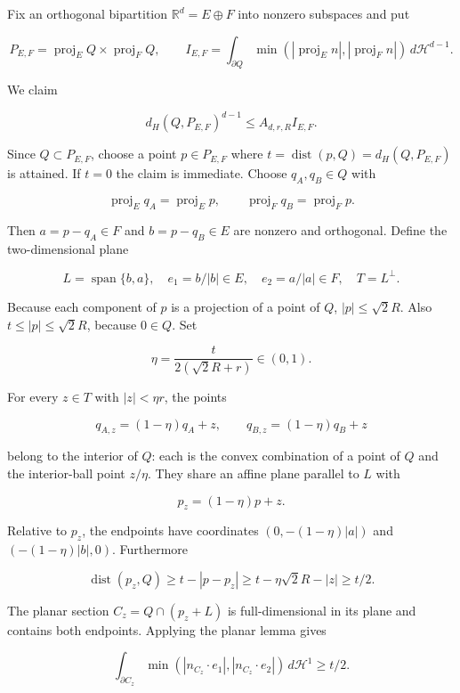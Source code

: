 \documentclass[
  11pt,
]{article}
\begin{document}
Fix an orthogonal bipartition \(\mathbb R^d=E\oplus F\) into nonzero
subspaces and put

\[
 P_{E,F}=\operatorname{proj}_E Q\times\operatorname{proj}_F Q,
\qquad
 I_{E,F}=\int_{\partial Q}
        \min(|\operatorname{proj}_E n|,|\operatorname{proj}_F n|)
        \,d\mathcal H^{d-1}.
\]

We claim

\[
 d_H(Q,P_{E,F})^{d-1}\le A_{d,r,R}I_{E,F}.            \tag{3.1}
\]

Since \(Q\subset P_{E,F}\), choose a point \(p\in P_{E,F}\) where
\(t=\operatorname{dist}(p,Q)=d_H(Q,P_{E,F})\) is attained. If \(t=0\)
the claim is immediate. Choose \(q_A,q_B\in Q\) with

\[
 \operatorname{proj}_E q_A=\operatorname{proj}_E p,
\qquad
 \operatorname{proj}_F q_B=\operatorname{proj}_F p.
\]

Then \(a=p-q_A\in F\) and \(b=p-q_B\in E\) are nonzero and orthogonal.
Define the two-dimensional plane

\[
 L=\operatorname{span}\{b,a\},\quad
 e_1=b/|b|\in E,\quad e_2=a/|a|\in F,\quad T=L^\perp.
\]

Because each component of \(p\) is a projection of a point of \(Q\),
\(|p|\le\sqrt2R\). Also \(t\le |p|\le\sqrt2R\), because \(0\in Q\). Set

\[
 \eta=\frac{t}{2(\sqrt2R+r)}\in(0,1).
\]

For every \(z\in T\) with \(|z|<\eta r\), the points

\[
 q_{A,z}=(1-\eta)q_A+z,\qquad
 q_{B,z}=(1-\eta)q_B+z
\]

belong to the interior of \(Q\): each is the convex combination of a
point of \(Q\) and the interior-ball point \(z/\eta\). They share an
affine plane parallel to \(L\) with

\[
 p_z=(1-\eta)p+z.
\]

Relative to \(p_z\), the endpoints have coordinates \((0,-(1-\eta)|a|)\)
and \((-(1-\eta)|b|,0)\). Furthermore

\[
 \operatorname{dist}(p_z,Q)
 \ge t-|p-p_z|
 \ge t-\eta\sqrt2R-|z|
 \ge t/2.                                           \tag{3.2}
\]

The planar section \(C_z=Q\cap(p_z+L)\) is full-dimensional in its plane
and contains both endpoints. Applying the planar lemma gives

\[
 \int_{\partial C_z}
       \min(|n_{C_z}\cdot e_1|,|n_{C_z}\cdot e_2|)
       \,d\mathcal H^1\ge t/2.                     \tag{3.3}
\]
\end{document}
